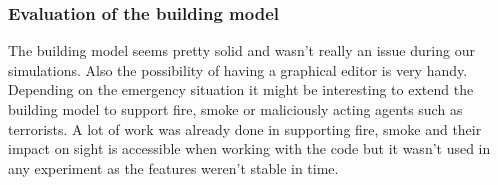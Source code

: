 \documentclass[11pt]{article}
\begin{document}
%
%    
%
%
%


\subsubsection{Evaluation of the building model}
The building model seems pretty solid and wasn't really an issue during our simulations. Also the possibility of having a graphical editor is very handy. Depending on the emergency situation it might be interesting to extend the building model to support fire, smoke or maliciously acting agents such as terrorists. A lot of work was already done in supporting fire, smoke and their impact on sight is accessible when working with the code but it wasn't used in any experiment as the features weren't stable in time.
\end{document}
